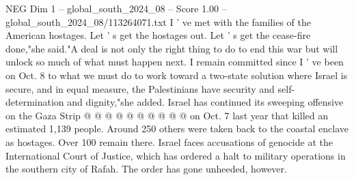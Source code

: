 \begin{textsample}{NEG Dim 1 – global\_south\_2024\_08 – Score 1.00 – global\_south\_2024\_08/113264071.txt}
I ' ve met with the families of the American hostages.
Let ' s get the hostages out.
Let ' s get the cease-fire done,"she said."A deal is not only the right thing to do to end this war but will unlock so much of what must happen next.
I remain committed since I ' ve been on Oct. 8 to what we must do to work toward a two-state solution where Israel is secure, and in equal measure, the Palestinians have security and self-determination and dignity,"she added.
Israel has continued its sweeping offensive on the Gaza Strip @ @ @ @ @ @ @ @ @ @ on Oct. 7 last year that killed an estimated 1,139 people.
Around 250 others were taken back to the coastal enclave as hostages.
Over 100 remain there.
Israel faces accusations of genocide at the International Court of Justice, which has ordered a halt to military operations in the southern city of Rafah.
The order has gone unheeded, however.

\end{textsample}
